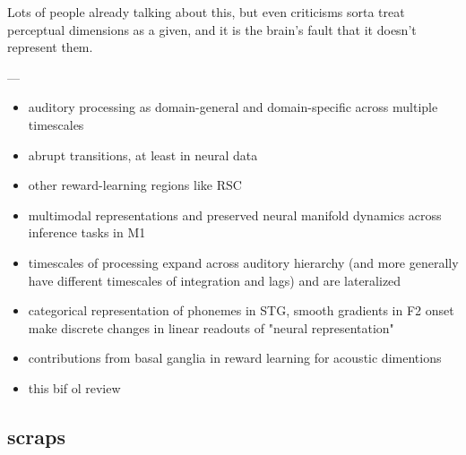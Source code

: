 Lots of people already talking about this, but even criticisms sorta treat perceptual dimensions as a given, and it is the brain's fault that it doesn't represent them. \cite{goddardInterpretingDimensionsNeural2018a}

---


\begin{itemize}
\item auditory processing as domain-general and domain-specific across multiple timescales \cite{norman-haignereHierarchicalIntegrationMultiple2020}
\item abrupt transitions, at least in neural data \cite{durstewitzAbruptTransitionsPrefrontal2010}
\item other reward-learning regions like RSC \cite{millerRetrosplenialCorticalRepresentations2019}
\item multimodal representations and preserved neural manifold dynamics across inference tasks in M1 \cite{gallegoCorticalPopulationActivity2018}
\item timescales of processing expand across auditory hierarchy (and more generally have different timescales of integration and lags) \cite{norman-haignereHierarchicalIntegrationMultiple2020} and are lateralized \cite{levyCircuitAsymmetriesUnderlie2019a}
\item categorical representation of phonemes in STG, smooth gradients in F2 onset make discrete changes in linear readouts of "neural representation" \cite{changCategoricalSpeechRepresentation2010b}
\item contributions from basal ganglia in reward learning for acoustic dimentions \cite{limHowMayBasal2014}
\item this bif ol review \cite{rauscheckerMapsStreamsAuditory2009b}
\end{itemize}



\subsection{scraps}


